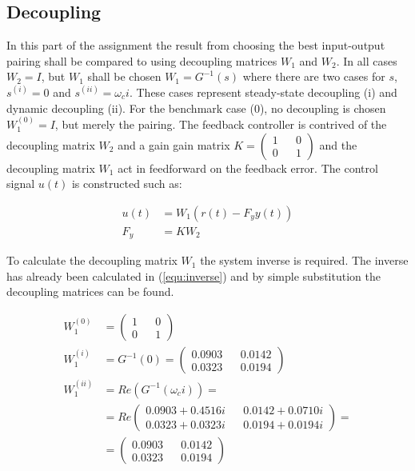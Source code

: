 \documentclass[a4paper, titlepage]{article}
\begin{document}
\subsection{Decoupling}
In this part of the assignment the result from choosing the best input-output pairing shall be compared to using decoupling matrices $W_1$ and $W_2$.
In all cases $W_2 = I$, but $W_1$ shall be chosen $W_1 = G^{-1}(s)$ where there are two cases for $s$, $s^{(i)} = 0$ and $s^{(ii)}=\omega_ci$.
These cases represent steady-state decoupling (i) and dynamic decoupling (ii).
For the benchmark case (0), no decoupling is chosen $W^{(0)}_1 = I$, but merely the pairing.
The feedback controller is contrived of the decoupling matrix $W_2$ and a gain gain matrix $K = \begin{pmatrix} 1 && 0 \\ 0 && 1 \end{pmatrix}$ and the decoupling matrix $W_1$ act in feedforward on the feedback error.
The control signal $u(t)$ is constructed such as:

\begin{equation}
\begin{split}
u(t) &= W_1(r(t) - F_yy(t)) \\
F_y &= KW_2
\end{split}
\label{equ:fbControl}
\end{equation}

To calculate the decoupling matrix $W_1$ the system inverse is required.
The inverse has already been calculated in (\ref{equ:inverse}) and by simple substitution the decoupling matrices can be found.

\begin{equation}
\begin{split}
W^{(0)}_1 &= 
\begin{pmatrix}
1 && 0 \\ 0 && 1
\end{pmatrix} \\
W^{(i)}_1 &= G^{-1}(0) = 
\begin{pmatrix}
0.0903 && 0.0142 \\ 0.0323 && 0.0194
\end{pmatrix} \\
W^{(ii)}_1 &= Re(G^{-1}(\omega_ci)) = \\
&=
Re\begin{pmatrix}
0.0903 + 0.4516i && 0.0142 + 0.0710i \\
0.0323 + 0.0323i && 0.0194 + 0.0194i
\end{pmatrix} = \\
&= 
\begin{pmatrix}
0.0903 && 0.0142 \\ 0.0323 && 0.0194
\end{pmatrix}
\end{split}
\label{equ:decoupling}
\end{equation}
\end{document}
